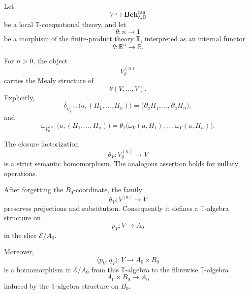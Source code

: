 \begin{proposition}
\label{prop:inherited-structured-operations}
    Let
    \[
        V\hookrightarrow
        \mathbf{Beh}^{\mathrm{can}}_{\mathbb A,\mathbb B}
    \]
    be a local \(\mathbb T\)-coequational theory, and let
    \[
        \theta:n\to1
    \]
    be a morphism of the finite-product theory \(\mathbb T\), interpreted as
    an internal functor
    \[
        \theta:\mathbb B^n\to\mathbb B.
    \]

    For \(n>0\), the object
    \[
        V^{(n)}_\theta
    \]
    carries the Mealy structure of
    \[
        \theta(V,\dots,V).
    \]
    Explicitly,
    \[
        \delta_{V^{(n)}_\theta}
        \bigl(
            a,(H_1,\dots,H_n)
        \bigr)
        =
        \bigl(
            \partial_aH_1,
            \dots,
            \partial_aH_n
        \bigr),
    \]
    and
    \[
        \omega_{V^{(n)}_\theta}
        \bigl(
            a,(H_1,\dots,H_n)
        \bigr)
        =
        \theta_1
        \bigl(
            \omega_V(a,H_1),
            \dots,
            \omega_V(a,H_n)
        \bigr).
    \]

    The closure factorization
    \[
        \theta_V:
        V^{(n)}_\theta\to V
    \]
    is a strict semantic homomorphism. The analogous assertion holds for
    nullary operations.

    After forgetting the \(B_0\)-coordinate, the family
    \[
        \theta_V:V^{[n]}\to V
    \]
    preserves projections and substitution. Consequently it defines a
    \(\mathbb T\)-algebra structure on
    \[
        p_V:V\to A_0
    \]
    in the slice \(\mathcal E/A_0\).

    Moreover,
    \[
        \langle p_V,q_V\rangle:
        V\to A_0\times B_0
    \]
    is a homomorphism in \(\mathcal E/A_0\) from this
    \(\mathbb T\)-algebra to the fibrewise \(\mathbb T\)-algebra
    \[
        A_0\times B_0\to A_0
    \]
    induced by the \(\mathbb T\)-algebra structure on \(B_0\).
\end{proposition}

